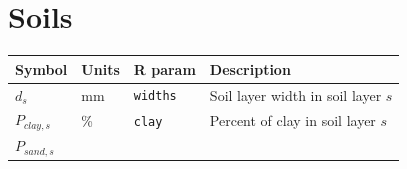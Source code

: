 \documentclass[]{book}
\begin{document}
\hypertarget{soils}{%
\section{Soils}\label{soils}}

\begin{longtable}[]{@{}llll@{}}
\toprule
\begin{minipage}[b]{0.11\columnwidth}\raggedright
Symbol\strut
\end{minipage} & \begin{minipage}[b]{0.10\columnwidth}\raggedright
Units\strut
\end{minipage} & \begin{minipage}[b]{0.12\columnwidth}\raggedright
R param\strut
\end{minipage} & \begin{minipage}[b]{0.45\columnwidth}\raggedright
Description\strut
\end{minipage}\tabularnewline
\midrule
\endhead
\begin{minipage}[t]{0.11\columnwidth}\raggedright
\(d_{s}\)\strut
\end{minipage} & \begin{minipage}[t]{0.10\columnwidth}\raggedright
mm\strut
\end{minipage} & \begin{minipage}[t]{0.12\columnwidth}\raggedright
\texttt{widths}\strut
\end{minipage} & \begin{minipage}[t]{0.45\columnwidth}\raggedright
Soil layer width in soil layer \(s\)\strut
\end{minipage}\tabularnewline
\begin{minipage}[t]{0.11\columnwidth}\raggedright
\(P_{clay,s}\)\strut
\end{minipage} & \begin{minipage}[t]{0.10\columnwidth}\raggedright
\%\strut
\end{minipage} & \begin{minipage}[t]{0.12\columnwidth}\raggedright
\texttt{clay}\strut
\end{minipage} & \begin{minipage}[t]{0.45\columnwidth}\raggedright
Percent of clay in soil layer \(s\)\strut
\end{minipage}\tabularnewline
\begin{minipage}[t]{0.11\columnwidth}\raggedright
\(P_{sand,s}\)\strut
\end{minipage} & \begin{minipage}[t]{0.10\columnwidth}\raggedright

\end{minipage}
\end{longtable}
\end{document}
